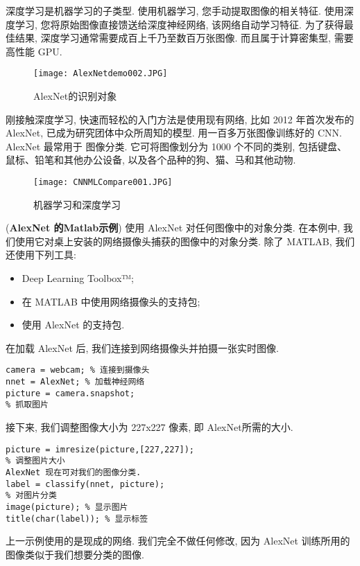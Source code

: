 深度学习是机器学习的子类型. 使用机器学习, 您手动提取图像的相关特征. 使用深度学习, 您将原始图像直接馈送给深度神经网络, 该网络自动学习特征.
为了获得最佳结果, 深度学习通常需要成百上千乃至数百万张图像. 而且属于计算密集型, 需要高性能 GPU.
\begin{figure}[H]
\centering
\texttt{[image: AlexNetdemo002.JPG]}
\caption{AlexNet的识别对象}
\label{AlexNetdemo002}
\vspace{-0.4cm}
\end{figure}
刚接触深度学习, 快速而轻松的入门方法是使用现有网络, 比如 2012 年首次发布的AlexNet, 已成为研究团体中众所周知的模型. 用一百多万张图像训练好的 CNN.  AlexNet 最常用于
图像分类. 它可将图像划分为 1000 个不同的类别, 包括键盘、鼠标、铅笔和其他办公设备, 以及各个品种的狗、猫、马和其他动物.
\begin{figure}[H]
\centering
\texttt{[image: CNNMLCompare001.JPG]}
\caption{机器学习和深度学习}
\label{CNNMLCompare001}
\vspace{-0.4cm}
\end{figure}
\begin{example}
(\textbf{AlexNet 的Matlab示例}) 使用 AlexNet 对任何图像中的对象分类. 在本例中, 我们使用它对桌上安装的网络摄像头捕获的图像中的对象分类. 除了 MATLAB, 我们还使用下列工具:
\begin{itemize}
\item Deep Learning Toolbox™;
\item 在 MATLAB 中使用网络摄像头的支持包;
\item 使用 AlexNet 的支持包.
\end{itemize}
在加载 AlexNet 后, 我们连接到网络摄像头并拍摄一张实时图像.
\begin{Verbatim}
camera = webcam; % 连接到摄像头
nnet = AlexNet; % 加载神经网络
picture = camera.snapshot;
% 抓取图片
\end{Verbatim}
接下来, 我们调整图像大小为 227x227 像素, 即 AlexNet所需的大小.
\begin{Verbatim}
picture = imresize(picture,[227,227]);
% 调整图片大小
AlexNet 现在可对我们的图像分类.
label = classify(nnet, picture);
% 对图片分类
image(picture); % 显示图片
title(char(label)); % 显示标签
\end{Verbatim}
\end{example}
上一示例使用的是现成的网络. 我们完全不做任何修改, 因为 AlexNet 训练所用的图像类似于我们想要分类的图像.

